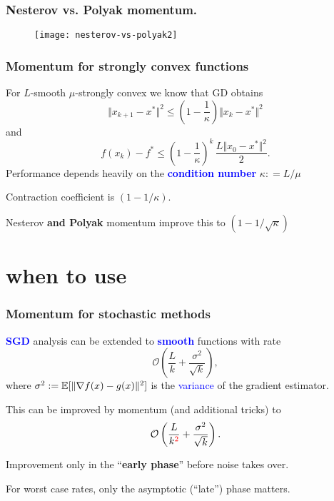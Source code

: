 \documentclass[aspectratio=149]{beamer}
\begin{document}
\begin{frame}
  \frametitle{Nesterov vs. Polyak momentum.}
  \vspace{-0.2cm}
  \begin{figure}[ht]
    \centering
    \texttt{[image: nesterov-vs-polyak2]}
  \end{figure}
\end{frame}

\begin{frame}
  \frametitle{Momentum for strongly convex functions}

  For $L$-smooth $\mu$-strongly convex we know that GD obtains
  \begin{equation}
    \Vert x_{k+1} - x^* \Vert^2 \le \left(1 - \frac{1}{\kappa}\right) \Vert x_k -x^* \Vert^2
  \end{equation}
  and
  \begin{equation}
    f(x_k)-f^* \le {\left(1-\frac{1}{\kappa}\right)}^k \, \frac{L \Vert x_0 -x^* \Vert^2}{2}.
  \end{equation}
  Performance depends heavily on the \textbf{\textcolor{blue}{condition number}} $\kappa : = L/\mu$
  \begin{block}{}
    \center
    Contraction coefficient is $(1-1/\kappa)$.
  \end{block}

  Nesterov \textbf{and Polyak} momentum improve this to $(1-1/\sqrt{\kappa})$
\end{frame}


\section{when to use}%
\label{sec:}

\begin{frame}
  \frametitle{Momentum for stochastic methods}
  \textbf{\textcolor{blue}{SGD}} analysis can be extended to \textbf{\textcolor{blue}{smooth}} functions with rate
  \begin{equation}
    \mathcal{O}\left(\frac{L}{k} + \frac{\sigma^2}{\sqrt{k}}\right),
  \end{equation}
  where $\sigma^2:= \mathbb{E} [ \Vert \nabla f(x) - g(x) \Vert^2 ]$ is the \textcolor{blue}{variance} of the gradient estimator.

  \medskip
  This can be improved by momentum (and additional tricks) to
  \begin{equation}
    \mathcal{O}\left(\frac{L}{k^{\textcolor{red}{2}}} + \frac{\sigma^2}{\sqrt{k}}\right).
  \end{equation}

  Improvement only in the ``\textbf{early phase}'' before noise takes over.

  \begin{block}{}
    \centering
    For worst case rates, only the asymptotic (``late'') phase matters.
  \end{block}
\end{frame}
\end{document}
